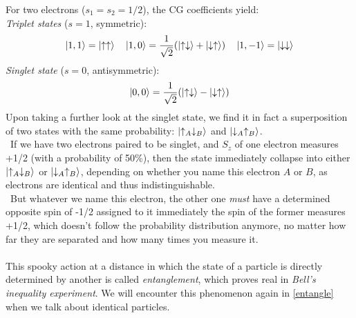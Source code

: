 For two electrons ($s_1 = s_2 = 1/2$), the CG coefficients yield:\\
\emph{Triplet states} ($s=1$, symmetric):
\[
    \ket{1,1} = \ket{\uparrow\uparrow} \quad
    \ket{1,0} = \frac{1}{\sqrt{2}}(\ket{\uparrow\downarrow} + \ket{\downarrow\uparrow}) \quad
    \ket{1,-1} = \ket{\downarrow\downarrow}
\]
\emph{Singlet state} ($s=0$, antisymmetric):
\[
    \ket{0,0} = \frac{1}{\sqrt{2}}(\ket{\uparrow\downarrow} - \ket{\downarrow\uparrow})
\]
Upon taking a further look at the singlet state, we find it in fact a superposition of two states with the same probability: 
$\ket{\uparrow_A\downarrow_B}$ and $\ket{\downarrow_A\uparrow_B}$.\\
\ If we have two electrons paired to be singlet, and $S_z$ of one electron measures +1/2 (with a probability of 50\%), 
then the state immediately collapse into either $\ket{\uparrow_A\downarrow_B}$ or $\ket{\downarrow_A\uparrow_B}$, 
depending on whether you name this electron $A$ or $B$, as electrons are identical and thus indistinguishable.\\
\ But whatever we name this electron, the other one \emph{must} have a determined opposite spin of -1/2 assigned to it 
immediately the spin of the former measures +1/2, 
which doesn't follow the probability distribution anymore, no matter how far they are separated and how many times you measure it.\\ \\
This spooky action at a distance in which the state of a particle is directly determined by another is called \emph{entanglement}, 
which proves real in \emph{Bell's inequality experiment}.
We will encounter this phenomenon again in \ref{entangle} when we talk about identical particles.\label{entangle2}



